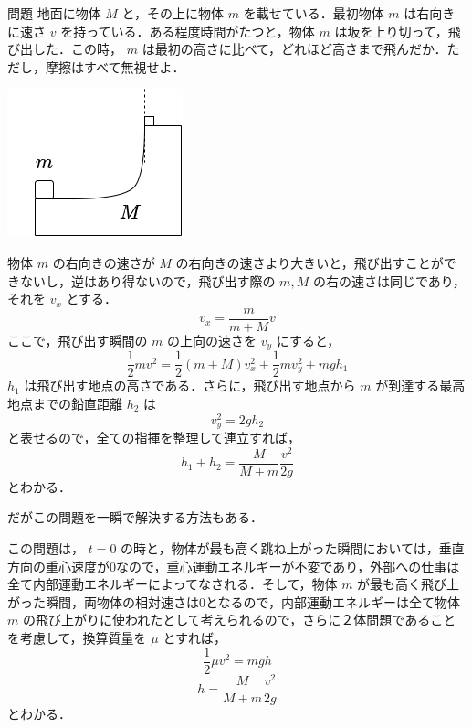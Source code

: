 \documentclass[
  b4paperpaper,
  xelatex,ja=standard]{bxjsbook}
\begin{document}
\begin{Qbox}{問題}
地面に物体 \(M\) と，その上に物体 \(m\) を載せている．最初物体 \(m\)
は右向きに速さ \(v\) を持っている．ある程度時間がたつと，物体 \(m\)
は坂を上り切って，飛び出した．この時， \(m\)
は最初の高さに比べて，どれほど高さまで飛んだか．ただし，摩擦はすべて無視せよ．

\includegraphics{source/images/energy/energy1.png}

\end{Qbox}


物体 \(m\) の右向きの速さが \(M\)
の右向きの速さより大きいと，飛び出すことができないし，逆はあり得ないので，飛び出す際の
\(m,M\) の右の速さは同じであり，それを \(v_x\) とする．
\[v_x=\frac{m}{m+M}v\] ここで，飛び出す瞬間の \(m\) の上向の速さを
\(v_y\) にすると，
\[\frac{1}{2}mv^2=\frac{1}{2}(m+M)v_x^2+\frac{1}{2}mv_y^2+mgh_1\]
\(h_1\) は飛び出す地点の高さである．さらに，飛び出す地点から \(m\)
が到達する最高地点までの鉛直距離 \(h_2\) は \[v_y^2=2gh_2\]
と表せるので，全ての指揮を整理して連立すれば，
\[h_1+h_2=\frac{M}{M+m}\frac{v^2}{2g}\] とわかる．

だがこの問題を一瞬で解決する方法もある．

この問題は， \(t=0\)
の時と，物体が最も高く跳ね上がった瞬間においては，垂直方向の重心速度が0なので，重心運動エネルギーが不変であり，外部への仕事は全て内部運動エネルギーによってなされる．そして，物体
\(m\)
が最も高く飛び上がった瞬間，両物体の相対速さは0となるので，内部運動エネルギーは全て物体
\(m\)
の飛び上がりに使われたとして考えられるので，さらに２体問題であることを考慮して，換算質量を
\(\mu\) とすれば， \[\frac{1}{2}\mu v^2=mgh\]
\[h=\frac{M}{M+m}\frac{v^2}{2g}\] とわかる．
\end{document}
